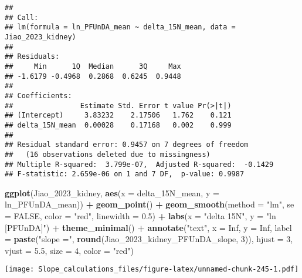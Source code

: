 \documentclass[
]{article}
\newenvironment{Shaded}{\begin{snugshade}}{\end{snugshade}}
\newcommand{\AttributeTok}[1]{\textcolor[rgb]{0.13,0.29,0.53}{#1}}
\newcommand{\ConstantTok}[1]{\textcolor[rgb]{0.56,0.35,0.01}{#1}}
\newcommand{\DecValTok}[1]{\textcolor[rgb]{0.00,0.00,0.81}{#1}}
\newcommand{\FloatTok}[1]{\textcolor[rgb]{0.00,0.00,0.81}{#1}}
\newcommand{\FunctionTok}[1]{\textcolor[rgb]{0.13,0.29,0.53}{\textbf{#1}}}
\newcommand{\NormalTok}[1]{#1}
\newcommand{\SpecialCharTok}[1]{\textcolor[rgb]{0.81,0.36,0.00}{\textbf{#1}}}
\newcommand{\StringTok}[1]{\textcolor[rgb]{0.31,0.60,0.02}{#1}}
\begin{document}
\begin{verbatim}
## 
## Call:
## lm(formula = ln_PFUnDA_mean ~ delta_15N_mean, data = Jiao_2023_kidney)
## 
## Residuals:
##     Min      1Q  Median      3Q     Max 
## -1.6179 -0.4968  0.2868  0.6245  0.9448 
## 
## Coefficients:
##                Estimate Std. Error t value Pr(>|t|)
## (Intercept)     3.83232    2.17506   1.762    0.121
## delta_15N_mean  0.00028    0.17168   0.002    0.999
## 
## Residual standard error: 0.9457 on 7 degrees of freedom
##   (16 observations deleted due to missingness)
## Multiple R-squared:  3.799e-07,  Adjusted R-squared:  -0.1429 
## F-statistic: 2.659e-06 on 1 and 7 DF,  p-value: 0.9987
\end{verbatim}

\begin{Shaded}
\begin{Highlighting}[]
\FunctionTok{ggplot}\NormalTok{(Jiao\_2023\_kidney, }\FunctionTok{aes}\NormalTok{(}\AttributeTok{x =}\NormalTok{ delta\_15N\_mean, }\AttributeTok{y =}\NormalTok{ ln\_PFUnDA\_mean)) }\SpecialCharTok{+}
  \FunctionTok{geom\_point}\NormalTok{() }\SpecialCharTok{+}
  \FunctionTok{geom\_smooth}\NormalTok{(}\AttributeTok{method =} \StringTok{"lm"}\NormalTok{, }\AttributeTok{se =} \ConstantTok{FALSE}\NormalTok{, }\AttributeTok{color =} \StringTok{"red"}\NormalTok{, }\AttributeTok{linewidth =} \FloatTok{0.5}\NormalTok{) }\SpecialCharTok{+}
  \FunctionTok{labs}\NormalTok{(}\AttributeTok{x =} \StringTok{"delta 15N"}\NormalTok{,}
       \AttributeTok{y =} \StringTok{"ln [PFUnDA]"}\NormalTok{) }\SpecialCharTok{+}
  \FunctionTok{theme\_minimal}\NormalTok{() }\SpecialCharTok{+}
  \FunctionTok{annotate}\NormalTok{(}\StringTok{"text"}\NormalTok{, }\AttributeTok{x =} \ConstantTok{Inf}\NormalTok{, }\AttributeTok{y =} \ConstantTok{Inf}\NormalTok{, }\AttributeTok{label =} \FunctionTok{paste}\NormalTok{(}\StringTok{"slope ="}\NormalTok{, }\FunctionTok{round}\NormalTok{(Jiao\_2023\_kidney\_PFUnDA\_slope, }\DecValTok{3}\NormalTok{)), }
           \AttributeTok{hjust =} \DecValTok{3}\NormalTok{, }\AttributeTok{vjust =} \FloatTok{5.5}\NormalTok{, }\AttributeTok{size =} \DecValTok{4}\NormalTok{, }\AttributeTok{color =} \StringTok{"red"}\NormalTok{)}
\end{Highlighting}
\end{Shaded}

\texttt{[image: Slope\_calculations\_files/figure-latex/unnamed-chunk-245-1.pdf]}
\end{document}
